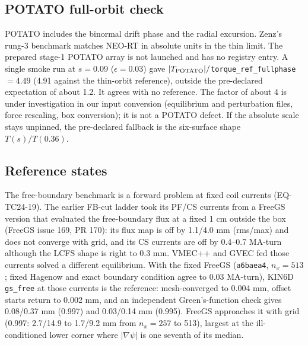 \subsection*{POTATO full-orbit check}
POTATO includes the binormal drift phase and the radial excursion. Zenz's rung-3 benchmark matches NEO-RT in
absolute units in the thin limit. The prepared stage-1 POTATO array is not launched and has no registry entry.
A single smoke run at $s=0.09$ ($\epsilon=0.03$) gave $|T_{\rm POTATO}|/$\texttt{torque\_ref\_fullphase}
$=4.49$ (4.91 against the thin-orbit reference), outside the pre-declared expectation of about 1.2. It agrees
with no reference. The factor of about 4 is under investigation in our input conversion (equilibrium and
perturbation files, force rescaling, box conversion); it is not a POTATO defect. If the absolute scale stays
unpinned, the pre-declared fallback is the six-surface shape $T(s)/T(0.36)$.

\subsection*{Reference states}
The free-boundary benchmark is a forward problem at fixed coil currents (EQ-TC24-19).
The earlier FB-cut ladder took its PF/CS currents from a FreeGS version that evaluated
the free-boundary flux at a fixed 1 cm outside the box (FreeGS issue 169, PR 170): its
flux map is off by 1.1/4.0 mm (rms/max) and does not converge with grid, and its CS
currents are off by 0.4--0.7 MA-turn although the LCFS shape is right to 0.3 mm.
VMEC++ and GVEC fed those currents solved a different equilibrium. With the fixed
FreeGS (\texttt{a6baea4}, $n_x=513$; fixed Hagenow and exact boundary condition agree to
0.03 MA-turn), KIN6D \texttt{gs\_free} at those currents is the reference: mesh-converged
to 0.004 mm, offset starts return to 0.002 mm, and an independent Green's-function check
gives 0.08/0.37 mm (0.997) and 0.03/0.14 mm (0.995). FreeGS approaches it with grid
(0.997: 2.7/14.9 to 1.7/9.2 mm from $n_x=257$ to 513), largest at the ill-conditioned
lower corner where $|\nabla\psi|$ is one seventh of its median.

